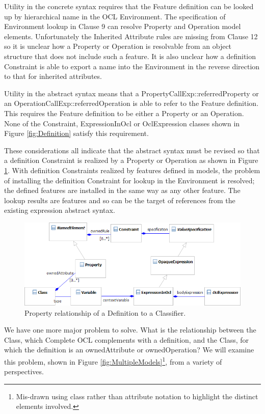 \documentclass{eceasst}
\begin{document}
Utility in the concrete syntax requires that the Feature definition can be looked up by hierarchical name in the OCL Environment. The specification of Environment lookup in Clause 9 can resolve Property and Operation model elements. Unfortunately the Inherited Attribute rules are missing from Clause 12 so it is unclear how a Property or Operation is resolvable from an object structure that does not include such a feature. It is also unclear how a definition Constraint is able to export a name into the Environment in the reverse direction to that for inherited attributes.

Utility in the abstract syntax means that a PropertyCallExp::referredProperty or an OperationCallExp::referredOperation is able to refer to the Feature definition. This requires the Feature definition to be either a Property or an Operation. None of the Constraint, ExpressionInOcl or OclExpression classes shown in Figure \ref{fig:Definition} satisfy this requirement.

These considerations all indicate that the abstract syntax must be revised so that a definition Constraint is realized by a Property or Operation as shown in Figure \ref{fig:PropertyDefinition}. With definition Constraints realized by features defined in models, the problem of installing the definition Constraint for lookup in the Environment is resolved; the defined features are installed in the same way as any other feature. The lookup results are features and so can be the target of references from the existing expression abstract syntax.

\begin{figure}
  \begin{center}
    \includegraphics[width=5.0in]{PropertyDefinition.png}
  \end{center}
  \caption{Property relationship of a Definition to a Classifier.}
  \label{fig:PropertyDefinition}
\end{figure}

We have one more major problem to solve. What is the relationship between the Class, which Complete OCL complements with a definition, and the Class, for which the definition is an owned\-Attribute or owned\-Operation? We will examine this problem, shown in Figure \ref{fig:MultipleModels}\footnote{Mis-drawn using class rather than attribute notation to highlight the distinct elements involved.}, from a variety of perspectives. 
\end{document}
